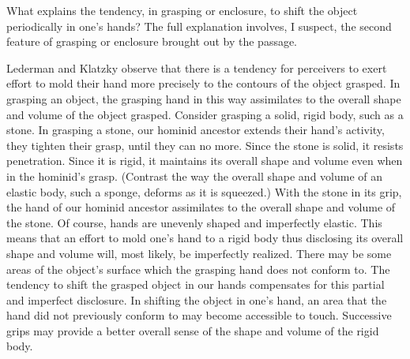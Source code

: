 \documentclass[12pt]{article}
\begin{document}
What explains the tendency, in grasping or enclosure, to shift the object periodically in one's hands? The full explanation involves, I suspect, the second feature of grasping or enclosure brought out by the passage. 

Lederman and Klatzky observe that there is a tendency for perceivers to exert effort to mold their hand more precisely to the contours of the object grasped. In grasping an object, the grasping hand in this way assimilates to the overall shape and volume of the object grasped. Consider grasping a solid, rigid body, such as a stone. In grasping a stone, our hominid ancestor extends their hand's activity, they tighten their grasp, until they can no more. Since the stone is solid, it resists penetration. Since it is rigid, it maintains its overall shape and volume even when in the hominid's grasp. (Contrast the way the overall shape and volume of an elastic body, such a sponge, deforms as it is squeezed.) With the stone in its grip, the hand of our hominid ancestor assimilates to the overall shape and volume of the stone. Of course, hands are unevenly shaped and imperfectly elastic. This means that an effort to mold one's hand to a rigid body thus disclosing its overall shape and volume will, most likely, be imperfectly realized. There may be some areas of the object's surface which the grasping hand does not conform to. The tendency to shift the grasped object in our hands compensates for this partial and imperfect disclosure. In shifting the object in one's hand, an area that the hand did not previously conform to may become accessible to touch. Successive grips may provide a better overall sense of the shape and volume of the rigid body. 
\end{document}
